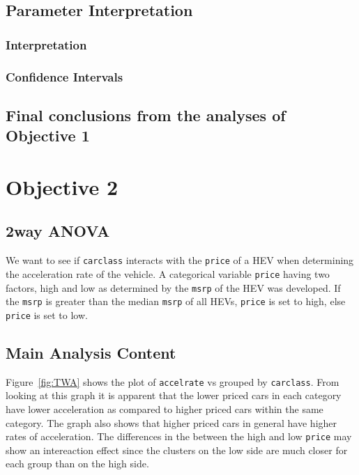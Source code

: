 \documentclass[acmsmall]{acmart}
\begin{document}
\subsection{Parameter Interpretation}
\subsubsection{Interpretation}

\subsubsection{Confidence Intervals}

\subsection{Final conclusions from the analyses of Objective 1}

\section{Objective 2}
\subsection{2way ANOVA}
We want to see if \texttt{carclass} interacts with the \texttt{price} of a HEV when determining the acceleration rate of the vehicle. A categorical variable \texttt{price} having two factors, high and low as determined by the \texttt{msrp} of the HEV was developed.  If the \texttt{msrp} is greater than the median \texttt{msrp} of all HEVs, \texttt{price} is set to high, else \texttt{price} is set to low.
\subsection{Main Analysis Content }
Figure~\ref{fig:TWA} shows the plot of \texttt{accelrate} vs  grouped by \texttt{carclass}. From looking at this graph it is apparent that the lower priced cars in each category have lower acceleration as compared to higher priced cars within the same category. The graph also shows that higher priced cars in general have higher rates of acceleration. The differences in the  between the high and low \texttt{price} may show an intereaction effect since the clusters on the low side are much closer for each group than on the high side.\\
\end{document}
